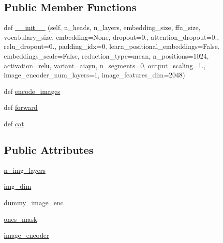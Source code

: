 \subsection*{Public Member Functions}
\begin{DoxyCompactItemize}
\item 
def \hyperlink{classparlai_1_1agents_1_1image__seq2seq_1_1modules_1_1ContextWithImageEncoder_a6216c55229638028ec13c3344cc53ca3}{\+\_\+\+\_\+init\+\_\+\+\_\+} (self, n\+\_\+heads, n\+\_\+layers, embedding\+\_\+size, ffn\+\_\+size, vocabulary\+\_\+size, embedding=None, dropout=0., attention\+\_\+dropout=0., relu\+\_\+dropout=0., padding\+\_\+idx=0, learn\+\_\+positional\+\_\+embeddings=False, embeddings\+\_\+scale=False, reduction\+\_\+type=\textquotesingle{}mean\textquotesingle{}, n\+\_\+positions=1024, activation=\textquotesingle{}relu\textquotesingle{}, variant=\textquotesingle{}aiayn\textquotesingle{}, n\+\_\+segments=0, output\+\_\+scaling=1., image\+\_\+encoder\+\_\+num\+\_\+layers=1, image\+\_\+features\+\_\+dim=2048)
\item 
def \hyperlink{classparlai_1_1agents_1_1image__seq2seq_1_1modules_1_1ContextWithImageEncoder_a4032d5006d44b81b5aee84d0730b5120}{encode\+\_\+images}
\item 
def \hyperlink{classparlai_1_1agents_1_1image__seq2seq_1_1modules_1_1ContextWithImageEncoder_a8fc65267bbc64c1f857c32d6ba9f260d}{forward}
\item 
def \hyperlink{classparlai_1_1agents_1_1image__seq2seq_1_1modules_1_1ContextWithImageEncoder_a03fc792c375aeca9a956a5f9835c5660}{cat}
\end{DoxyCompactItemize}
\subsection*{Public Attributes}
\begin{DoxyCompactItemize}
\item 
\hyperlink{classparlai_1_1agents_1_1image__seq2seq_1_1modules_1_1ContextWithImageEncoder_acb26c1f9fa9fbbca1db62a305a8dfdb9}{n\+\_\+img\+\_\+layers}
\item 
\hyperlink{classparlai_1_1agents_1_1image__seq2seq_1_1modules_1_1ContextWithImageEncoder_a017af72180b897a84386bb83a88022b3}{img\+\_\+dim}
\item 
\hyperlink{classparlai_1_1agents_1_1image__seq2seq_1_1modules_1_1ContextWithImageEncoder_a1337766f7b71d4a69ea0be7583014e83}{dummy\+\_\+image\+\_\+enc}
\item 
\hyperlink{classparlai_1_1agents_1_1image__seq2seq_1_1modules_1_1ContextWithImageEncoder_a1a7b103e68c6bbd72ee716ab52d9a6e0}{ones\+\_\+mask}
\item 
\hyperlink{classparlai_1_1agents_1_1image__seq2seq_1_1modules_1_1ContextWithImageEncoder_a7273fa3877627d0508497474546a7529}{image\+\_\+encoder}
\end{DoxyCompactItemize}
